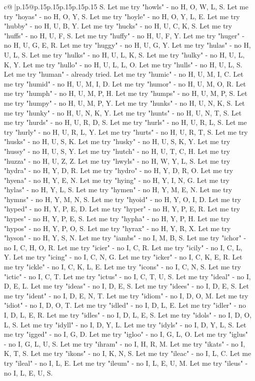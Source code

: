 \documentclass{article}
\begin{document}
{\begin{supertabular}{c@{$\;$}|p{.15\linewidth}@{}p{.15\linewidth}p{.15\linewidth}p{.15\linewidth}p{.15\linewidth}p{.15\linewidth}}
{{{S. Let me try "howls" {-} no H, O, W, L, S. Let me try "hoyas" {-} no H, O, Y, S. Let me try "hoyle" {-} no H, O, Y, L, E. Let me try "hubby" {-} no H, U, B, Y. Let me try "hucks" {-} no H, U, C, K, S. Let me try "huffs" {-} no H, U, F, S. Let me try "huffy" {-} no H, U, F, Y. Let me try "huger" {-} no H, U, G, E, R. Let me try "huggy" {-} no H, U, G, Y. Let me try "hulas" {-} no H, U, L, S. Let me try "hulks" {-} no H, U, L, K, S. Let me try "hulky" {-} no H, U, L, K, Y. Let me try "hullo" {-} no H, U, L, L, O. Let me try "hulls" {-} no H, U, L, S. Let me try "human" {-} already tried. Let me try "humic" {-} no H, U, M, I, C. Let me try "humid" {-} no H, U, M, I, D. Let me try "humor" {-} no H, U, M, O, R. Let me try "humph" {-} no H, U, M, P, H. Let me try "humps" {-} no H, U, M, P, S. Let me try "humpy" {-} no H, U, M, P, Y. Let me try "hunks" {-} no H, U, N, K, S. Let me try "hunky" {-} no H, U, N, K, Y. Let me try "hunts" {-} no H, U, N, T, S. Let me try "hurds" {-} no H, U, R, D, S. Let me try "hurls" {-} no H, U, R, L, S. Let me try "hurly" {-} no H, U, R, L, Y. Let me try "hurts" {-} no H, U, R, T, S. Let me try "husks" {-} no H, U, S, K. Let me try "husky" {-} no H, U, S, K, Y. Let me try "hussy" {-} no H, U, S, Y. Let me try "hutch" {-} no H, U, T, C, H. Let me try "huzza" {-} no H, U, Z, Z. Let me try "hwyls" {-} no H, W, Y, L, S. Let me try "hydra" {-} no H, Y, D, R. Let me try "hydro" {-} no H, Y, D, R, O. Let me try "hyena" {-} no H, Y, E, N. Let me try "hying" {-} no H, Y, I, N, G. Let me try "hylas" {-} no H, Y, L, S. Let me try "hymen" {-} no H, Y, M, E, N. Let me try "hymns" {-} no H, Y, M, N, S. Let me try "hyoid" {-} no H, Y, O, I, D. Let me try "hyped" {-} no H, Y, P, E, D. Let me try "hyper" {-} no H, Y, P, E, R. Let me try "hypes" {-} no H, Y, P, E, S. Let me try "hypha" {-} no H, Y, P, H. Let me try "hypos" {-} no H, Y, P, O, S. Let me try "hyrax" {-} no H, Y, R, X. Let me try "hyson" {-} no H, Y, S, N. Let me try "iambs" {-} no I, M, B, S. Let me try "ichor" {-} no I, C, H, O, R. Let me try "icier" {-} no I, C, R. Let me try "icily" {-} no I, C, L, Y. Let me try "icing" {-} no I, C, N, G. Let me try "icker" {-} no I, C, K, E, R. Let me try "ickle" {-} no I, C, K, L, E. Let me try "icons" {-} no I, C, N, S. Let me try "ictic" {-} no I, C, T. Let me try "ictus" {-} no I, C, T, U, S. Let me try "ideal" {-} no I, D, E, L. Let me try "ideas" {-} no I, D, E, S. Let me try "idees" {-} no I, D, E, S. Let me try "ident" {-} no I, D, E, N, T. Let me try "idiom" {-} no I, D, O, M. Let me try "idiot" {-} no I, D, O, T. Let me try "idled" {-} no I, D, L, E. Let me try "idler" {-} no I, D, L, E, R. Let me try "idles" {-} no I, D, L, E, S. Let me try "idols" {-} no I, D, O, L, S. Let me try "idyll" {-} no I, D, Y, L. Let me try "idyls" {-} no I, D, Y, L, S. Let me try "igged" {-} no I, G, D. Let me try "igloo" {-} no I, G, L, O. Let me try "iglus" {-} no I, G, L, U, S. Let me try "ihram" {-} no I, H, R, M. Let me try "ikats" {-} no I, K, T, S. Let me try "ikons" {-} no I, K, N, S. Let me try "ileac" {-} no I, L, C. Let me try "ileal" {-} no I, L, E. Let me try "ileum" {-} no I, L, E, U, M. Let me try "ileus" {-} no I, L, E, U, S. }}}
\end{supertabular}}
\end{document}
